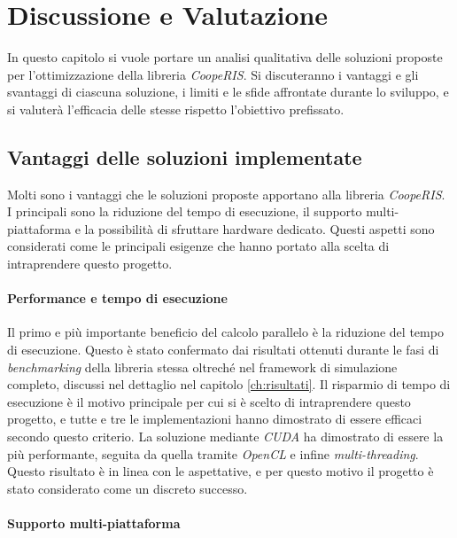 \section{Discussione e Valutazione}
\label{ch:discussione}

In questo capitolo si vuole portare un analisi qualitativa delle soluzioni proposte
per l'ottimizzazione della libreria \textit{CoopeRIS}. Si discuteranno i vantaggi
e gli svantaggi di ciascuna soluzione, i limiti e le sfide affrontate durante lo
sviluppo, e si valuterà l'efficacia delle stesse rispetto l'obiettivo prefissato.

\subsection{Vantaggi delle soluzioni implementate}
\label{subsec:vantaggi}

Molti sono i vantaggi che le soluzioni proposte apportano alla libreria \textit{CoopeRIS}.
I principali sono la riduzione del tempo di esecuzione, il supporto multi-piattaforma
e la possibilità di sfruttare hardware dedicato. Questi aspetti sono considerati
come le principali esigenze che hanno portato alla scelta di intraprendere
questo progetto.

\paragraph{Performance e tempo di esecuzione}
\label{para:performance}

Il primo e più importante beneficio del calcolo parallelo è la riduzione del
tempo di esecuzione. Questo è stato confermato dai risultati ottenuti durante le
fasi di \textit{benchmarking} della libreria stessa oltreché nel framework di
simulazione completo, discussi nel dettaglio nel capitolo \ref{ch:risultati}. Il
risparmio di tempo di esecuzione è il motivo principale per cui si è scelto di
intraprendere questo progetto, e tutte e tre le implementazioni hanno dimostrato
di essere efficaci secondo questo criterio. La soluzione mediante \textit{CUDA} ha
dimostrato di essere la più performante, seguita da quella tramite \textit{OpenCL}
e infine \textit{multi-threading}. Questo risultato è in linea con le aspettative,
e per questo motivo il progetto è stato considerato come un discreto successo.

\paragraph{Supporto multi-piattaforma}
\label{para:supporto}

